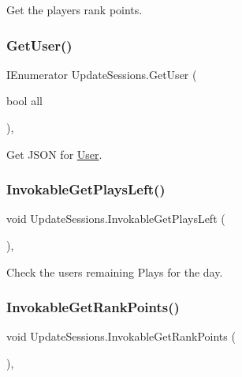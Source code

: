 Get the player\textquotesingle{}s rank points. 

\mbox{\label{class_update_sessions_a0d9f725dd5bd780272f19531fcc2c523}} 
\subsubsection{\texorpdfstring{GetUser()}{GetUser()}}
{\footnotesize\ttfamily I\+Enumerator Update\+Sessions.\+Get\+User (\begin{DoxyParamCaption}\item[{bool}]{all }\end{DoxyParamCaption})\hspace{0.3cm}{\ttfamily [inline]}, {\ttfamily [private]}}



Get J\+S\+ON for \mbox{\hyperlink{class_user}{User}}. 

\mbox{\label{class_update_sessions_af02a599b262f2ea1e620f7ec468f8ebb}} 
\subsubsection{\texorpdfstring{InvokableGetPlaysLeft()}{InvokableGetPlaysLeft()}}
{\footnotesize\ttfamily void Update\+Sessions.\+Invokable\+Get\+Plays\+Left (\begin{DoxyParamCaption}{ }\end{DoxyParamCaption})\hspace{0.3cm}{\ttfamily [inline]}, {\ttfamily [private]}}



Check the user\textquotesingle{}s remaining Plays for the day. 

\mbox{\label{class_update_sessions_a13b53f5d4ab3beafc880931c5870e740}} 
\subsubsection{\texorpdfstring{InvokableGetRankPoints()}{InvokableGetRankPoints()}}
{\footnotesize\ttfamily void Update\+Sessions.\+Invokable\+Get\+Rank\+Points (\begin{DoxyParamCaption}{ }\end{DoxyParamCaption})\hspace{0.3cm}{\ttfamily [inline]}, {\ttfamily [private]}}




